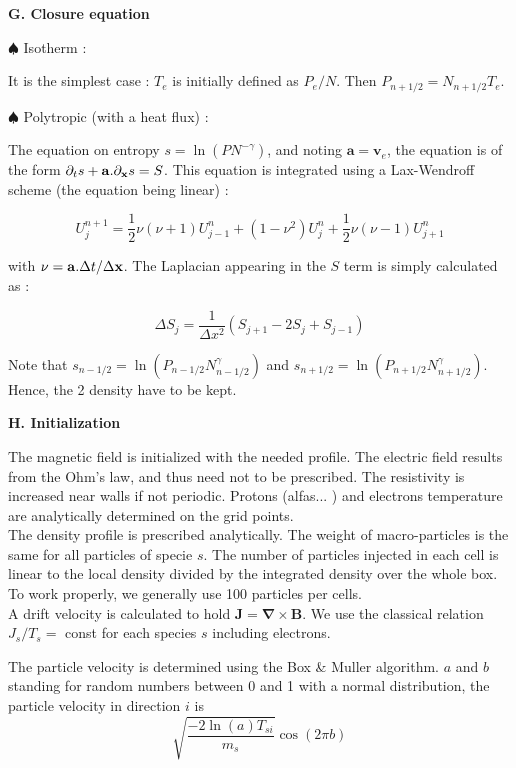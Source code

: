 \documentclass[a4paper,11pt]{letter}
\begin{document}
\newpage

{\bf G. Closure equation}

$\spadesuit$ Isotherm :

It is the simplest case : $T_e$ is initially defined as $P_e/N$. Then $P_{n+1/2} = N_{n+1/2} T_e$.

$\spadesuit$ Polytropic (with a heat flux) :

The equation on entropy $s = \ln (P N^{-\gamma})$, and noting $\mathbf a = \mathbf v_e$, the equation is of the form $\partial_t s + {\bf a} . \partial_{\bf x} s = S$. This equation is integrated using a Lax-Wendroff scheme (the equation being linear) :

$$
U_j^{n+1} = \frac{1}{2} \nu (\nu+1) U_{j-1}^n + (1-\nu^2) U_j^n + \frac{1}{2} \nu (\nu-1) U_{j+1}^n
$$

with $\nu = {\bf a} . \Delta t / \Delta {\bf x}$. The Laplacian appearing in the $S$ term is simply calculated as :

$$
\Delta S_j = \frac{1}{\Delta x^2} (S_{j+1} - 2 S_j + S_{j-1})
$$

Note that $s_{n-1/2} = \ln (P_{n-1/2} N_{n-1/2}^{\gamma})$ and $s_{n+1/2} = \ln (P_{n+1/2} N_{n+1/2}^{\gamma})$. Hence, the 2 density have to be kept.

\newpage

{\bf H. Initialization}

The magnetic field is initialized with the needed profile. The electric field results from the Ohm's law, and thus need not to be prescribed. The resistivity is increased near walls if not periodic. Protons (alfas... ) and electrons temperature are analytically determined on the grid points.\\

The density profile is prescribed analytically. The weight of macro-particles is the same for all particles of specie $s$. The number of particles injected in each cell is linear to the local density divided by the integrated density over the whole box. To work properly, we generally use 100 particles per cells.\\

A drift velocity is calculated to hold $\mathbf J = \boldsymbol{\nabla} \times \mathbf B$. We use the classical relation $J_s / T_s =$ const for each species $s$ including electrons.

The particle velocity is determined using the Box \& Muller algorithm. $a$ and $b$ standing for random numbers between 0 and 1 with a normal distribution, the particle velocity in direction $i$ is
$$
\sqrt{\frac{-2 \ln(a) T_{si}}{m_s}}\cos(2 \pi b)
$$
\end{document}
